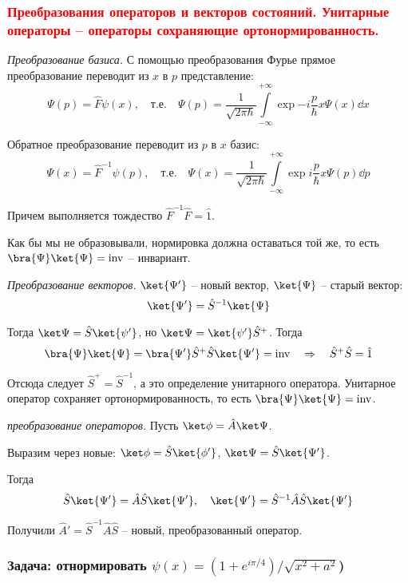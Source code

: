 \subsubsection{\textcolor{red}{Преобразования операторов и векторов состояний. Унитарные операторы – операторы сохраняющие ортонормированность.}}

\textit{Преобразование базиса.} 
С помощью преобразования Фурье прямое преобразование переводит из $x$ в $p$ представление: 
$$
\Psi(p)=\hat{F}\psi(x),\quad\text{т.е.}\quad
\Psi(p)=\frac{1}{\sqrt{2\pi\hbar}}\int\limits_{-\infty}^{+\infty}\exp{-i\frac{p}{\hbar}x} \Psi(x) \dd x
$$

Обратное преобразование переводит из $p$ в $x$  базис:
$$
\Psi(x)=\hat{F}^{-1}\psi(p),\quad\text{т.е.}\quad
\Psi(x)=\frac{1}{\sqrt{2\pi\hbar}}\int\limits_{-\infty}^{+\infty}\exp{i\frac{p}{\hbar}x} \Psi(p) \dd p
$$ 

Причем выполняется тождество $\hat{F}^{-1}\hat{F}=\hat{1}$.

Как бы мы не образовывали, нормировка должна оставаться той же, то есть $\bra{\Psi}\ket{\Psi}=\mathrm{inv}$ -- инвариант.

\textit{Преобразование векторов.} 
$\ket{\Psi'}$ -- новый вектор, $\ket{\Psi}$ -- старый вектор:
$$
\ket{\Psi'}=\hat{S}^{-1}\ket{\Psi}
$$

Тогда $\ket\Psi=\hat{S}\ket{\psi'}$, но $\ket\Psi=\ket{\psi'}\hat{S}^+$. Тогда  
$$
\bra{\Psi}\ket{\Psi}=\bra{\Psi'}\hat{S}^+\hat{S}\ket{\Psi'}=\mathrm{inv} \quad\Rightarrow\quad \hat{S}^+\hat{S}=\hat{1}
$$

Отсюда следует $\hat{S}^+=\hat{S}^{-1}$, а это определение унитарного оператора. Унитарное оператор сохраняет ортонормированность, то есть $\bra{\Psi}\ket{\Psi}=\mathrm{inv}$.

\textit{преобразование операторов.} Пусть $\ket\phi=\hat{A}\ket\Psi$.

Выразим через новые: $\ket\phi=\hat{S}\ket{\phi'}$, $\ket\Psi=\hat{S}\ket{\Psi'}$.

Тогда 
$$
\hat{S}\ket{\Psi'}=\hat{A}\hat{S}\ket{\Psi'}, \quad
\ket{\Psi'}=\hat{S}^{-1}\hat{A}\hat{S}\ket{\Psi'}
$$

Получили $\hat{A}'=\hat{S}^{-1}\hat{A}\hat{S}$ -- новый, преобразованный оператор.


\subsubsection{Задача: отнормировать $\psi(x)=({1+e^{i\pi/4}})/{\sqrt{x^2+a^2}}$)}\hypertarget{section-3}{}\label{section-3}

